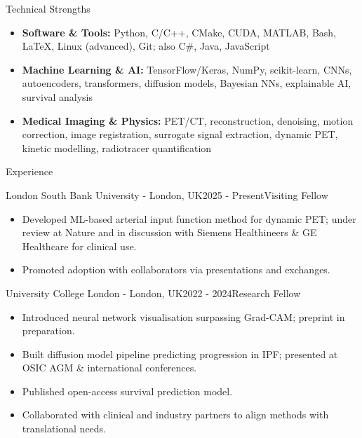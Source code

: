 \documentclass{cv}
\begin{document}
    
    \begin{spacing}{1.1}
        \begin{rSection}{Technical Strengths}
            \begin{itemize}
                \item \textbf{Software \& Tools:} Python, C/C++, CMake, CUDA, MATLAB, Bash, LaTeX, Linux (advanced), Git; also C\#, Java, JavaScript
                \item \textbf{Machine Learning \& AI:} TensorFlow/Keras, NumPy, scikit-learn, CNNs, autoencoders, transformers, diffusion models, Bayesian NNs, explainable AI, survival analysis
                \item \textbf{Medical Imaging \& Physics:} PET/CT, reconstruction, denoising, motion correction, image registration, surrogate signal extraction, dynamic PET, kinetic modelling, radiotracer quantification
            \end{itemize}
        \end{rSection}
        
        \begin{rSection}{Experience}
            \item \begin{rSubsection}{London South Bank University \textnormal{- London, UK}}{2025 - Present}{Visiting Fellow}{}
                \item \begin{itemize}
                    \item Developed ML-based arterial input function method for dynamic PET; under review at Nature and in discussion with Siemens Healthineers \& GE Healthcare for clinical use.
                    \item Promoted adoption with collaborators via presentations and exchanges.
                \end{itemize}
            \end{rSubsection}
            
            \item \begin{rSubsection}{University College London \textnormal{- London, UK}}{2022 - 2024}{Research Fellow}{}
                \item \begin{itemize}
                    \item Introduced neural network visualisation surpassing Grad-CAM; preprint in preparation.
                    \item Built diffusion model pipeline predicting progression in IPF; presented at OSIC AGM \& international conferences.
                    \item Published open-access survival prediction model.
                    \item Collaborated with clinical and industry partners to align methods with translational needs.
                \end{itemize}
            \end{rSubsection}
            

\end{rSection}
\end{spacing}
\end{document}
